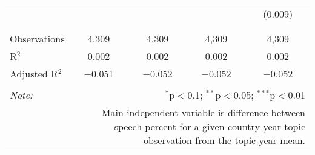 \begin{table}[!htbp]
\begin{tabular}{@{\extracolsep{5pt}}lcccc}
  &  &  &  & (0.009) \\ 
  & & & & \\ 
\hline \\[-1.8ex] 
Observations & 4,309 & 4,309 & 4,309 & 4,309 \\ 
R$^{2}$ & 0.002 & 0.002 & 0.002 & 0.002 \\ 
Adjusted R$^{2}$ & $-$0.051 & $-$0.052 & $-$0.052 & $-$0.052 \\ 
\hline 
\hline \\[-1.8ex] 
\textit{Note:}  & \multicolumn{4}{r}{$^{*}$p$<$0.1; $^{**}$p$<$0.05; $^{***}$p$<$0.01} \\ 
 & \multicolumn{4}{r}{Main independent variable is difference between speech percent for a given country-year-topic observation from the topic-year mean.} \\ 
\end{tabular} 
\end{table} 
